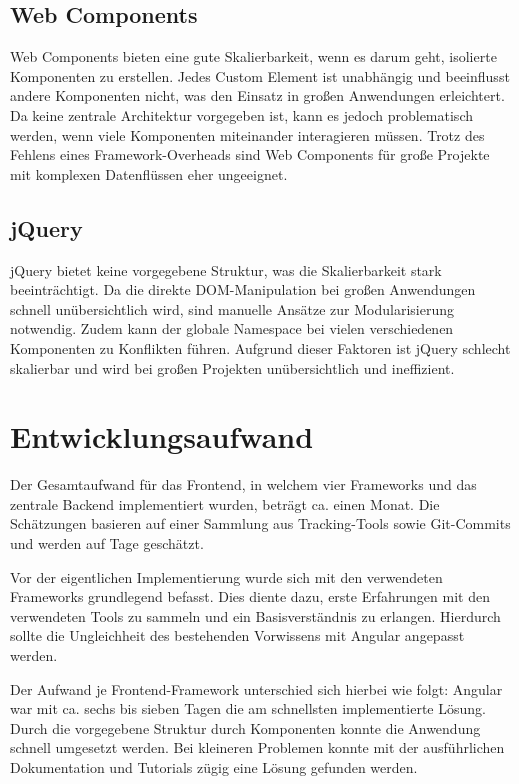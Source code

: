 \documentclass[oneside]{ausarbeitung}
\begin{document}
\subsection{Web Components}

Web Components bieten eine gute Skalierbarkeit, wenn es darum geht, isolierte Komponenten zu erstellen. Jedes Custom Element ist unabhängig und beeinflusst andere Komponenten nicht, was den Einsatz in großen Anwendungen erleichtert. Da keine zentrale Architektur vorgegeben ist, kann es jedoch problematisch werden, wenn viele Komponenten miteinander interagieren müssen. Trotz des Fehlens eines Framework-Overheads sind Web Components für große Projekte mit komplexen Datenflüssen eher ungeeignet.

\subsection{jQuery}

jQuery bietet keine vorgegebene Struktur, was die Skalierbarkeit stark beeinträchtigt. Da die direkte DOM-Manipulation bei großen Anwendungen schnell unübersichtlich wird, sind manuelle Ansätze zur Modularisierung notwendig. Zudem kann der globale Namespace bei vielen verschiedenen Komponenten zu Konflikten führen. Aufgrund dieser Faktoren ist jQuery schlecht skalierbar und wird bei großen Projekten unübersichtlich und ineffizient.

\section{Entwicklungsaufwand}

Der Gesamtaufwand für das Frontend, in welchem vier Frameworks und das zentrale Backend implementiert wurden, beträgt ca. einen Monat. Die Schätzungen basieren auf einer Sammlung aus Tracking-Tools sowie Git-Commits und werden auf Tage geschätzt.

Vor der eigentlichen Implementierung wurde sich mit den verwendeten Frameworks grundlegend befasst. Dies diente dazu, erste Erfahrungen mit den verwendeten Tools zu sammeln und ein Basisverständnis zu erlangen. Hierdurch sollte die Ungleichheit des bestehenden Vorwissens mit Angular angepasst werden.

Der Aufwand je Frontend-Framework unterschied sich hierbei wie folgt: Angular war mit ca. sechs bis sieben Tagen die am schnellsten implementierte Lösung. Durch die vorgegebene Struktur durch Komponenten konnte die Anwendung schnell umgesetzt werden. Bei kleineren Problemen konnte mit der ausführlichen Dokumentation und Tutorials zügig eine Lösung gefunden werden.
\end{document}
